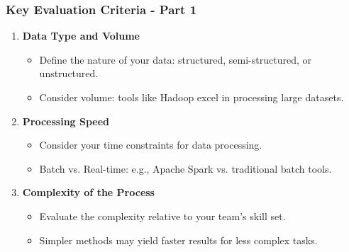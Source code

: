 \documentclass[aspectratio=169]{beamer}
\begin{document}
\begin{frame}[fragile]
    \frametitle{Key Evaluation Criteria - Part 1}
    \begin{enumerate}
        \item \textbf{Data Type and Volume}
        \begin{itemize}
            \item Define the nature of your data: structured, semi-structured, or unstructured.
            \item Consider volume: tools like Hadoop excel in processing large datasets.
        \end{itemize}
        
        \item \textbf{Processing Speed}
        \begin{itemize}
            \item Consider your time constraints for data processing.
            \item Batch vs. Real-time: e.g., Apache Spark vs. traditional batch tools.
        \end{itemize}

        \item \textbf{Complexity of the Process}
        \begin{itemize}
            \item Evaluate the complexity relative to your team's skill set.
            \item Simpler methods may yield faster results for less complex tasks.
        \end{itemize}
    \end{enumerate}
\end{frame}
\end{document}
